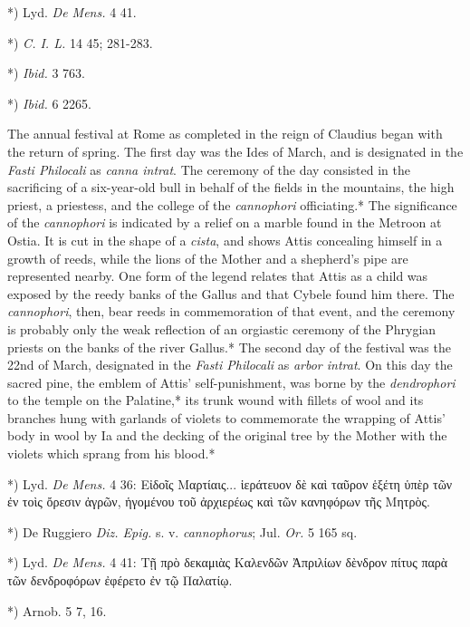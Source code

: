\documentclass[a4paper, 11pt, oneside, polutonikogreek, english]{article}
\begin{document}
*) Lyd. \emph{De Mens.} 4 41.

*) \emph{C. I. L.} 14 45; 281-283.

*) \emph{Ibid.} 3 763.

*) \emph{Ibid.} 6 2265.

The annual festival at Rome as completed in the reign of Claudius began with the return of spring. The first day was the Ides of March, and is designated in the \emph{Fasti Philocali} as \emph{canna intrat}. The ceremony of the day consisted in the sacrificing of a six-year-old bull in behalf of the fields in the mountains, the high priest, a priestess, and the college of the \emph{cannophori} officiating.* The significance of the \emph{cannophori} is indicated by a relief on a marble found in the Metroon at Ostia. It is cut in the shape of a \emph{cista}, and shows Attis concealing himself in a growth of reeds, while the lions of the Mother and a shepherd's pipe are represented nearby. One form of the legend relates that Attis as a child was exposed by the reedy banks of the Gallus and that Cybele found him there. The \emph{cannophori}, then, bear reeds in commemoration of that event, and the ceremony is probably only the weak reflection of an orgiastic ceremony of the Phrygian priests on the banks of the river Gallus.* The second day of the festival was the 22nd of March, designated in the \emph{Fasti Philocali} as \emph{arbor intrat}. On this day the sacred pine, the emblem of Attis' self-punishment, was borne by the \emph{dendrophori} to the temple on the Palatine,* its trunk wound with fillets of wool and its branches hung with garlands of violets to commemorate the wrapping of Attis' body in wool by Ia and the decking of the original tree by the Mother with the violets which sprang from his blood.*

*) Lyd. \emph{De Mens.} 4 36: Εἰδοῖς Μαρτίαις... ἱεράτευον δὲ καὶ ταῦρον ἑξέτη ὑπὲρ τῶν ἐν τοὶς ὄρεσιν ἀγρῶν, ἡγομένου τοῦ ἀρχιερέως καὶ τῶν κανηφόρων τῆς Μητρὸς.

*) De Ruggiero \emph{Diz. Epig.} s. v. \emph{cannophorus}; Jul. \emph{Or.} 5 165 sq.

*) Lyd. \emph{De Mens.} 4 41: Τῇ πρὸ δεκαμιὰς Καλενδῶν Ἀπριλίων δὲνδρον πίτυς παρὰ τῶν δενδροφόρων ἐφέρετο ἐν τῷ Παλατίῳ.

*) Arnob. 5 7, 16.
\end{document}
